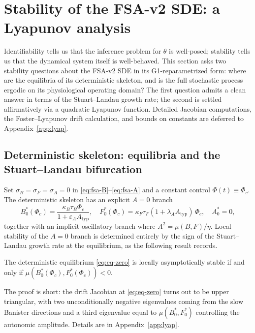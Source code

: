 \section{Stability of the FSA-v2 SDE: a Lyapunov analysis}\label{sec:lyap}

Identifiability tells us that the inference problem for $\theta$ is
well-posed; stability tells us that the dynamical system itself is
well-behaved. This section asks two stability questions about the
FSA-v2 SDE in its G1-reparametrized form: where are the equilibria
of its deterministic skeleton, and is the full stochastic process
ergodic on its physiological operating domain? The first question
admits a clean answer in terms of the Stuart--Landau growth rate;
the second is settled affirmatively via a quadratic Lyapunov
function. Detailed Jacobian computations, the Foster--Lyapunov drift
calculation, and bounds on constants are deferred to
Appendix~\ref{app:lyap}.

\subsection{Deterministic skeleton: equilibria and the Stuart--Landau bifurcation}\label{sec:lyap-det}

Set $\sigma_B = \sigma_F = \sigma_A = 0$ in
\eqref{eq:fsa-B}--\eqref{eq:fsa-A} and a constant control
$\Phi(t) \equiv \Phi_c$. The deterministic skeleton has an explicit
$A=0$ branch
\begin{equation}
  B^*_0(\Phi_c) = \frac{\kappa_B \tau_B \Phi_c}{1+\varepsilon_A A_{\mathrm{typ}}},
  \quad
  F^*_0(\Phi_c) = \kappa_F \tau_F (1+\lambda_A A_{\mathrm{typ}})\,\Phi_c,
  \quad
  A^*_0 = 0,
  \label{eq:eq-zero}
\end{equation}
together with an implicit oscillatory branch where $A^2 = \mu(B,F)/\eta$.
Local stability of the $A=0$ branch is determined entirely by the
sign of the Stuart--Landau growth rate at the equilibrium, as the
following result records.

\begin{proposition}[Local stability of the $A=0$ branch]\label{prop:stab-zero}
The deterministic equilibrium \eqref{eq:eq-zero} is locally
asymptotically stable if and only if
$\mu(B^*_0(\Phi_c), F^*_0(\Phi_c)) < 0$.
\end{proposition}

The proof is short: the drift Jacobian at \eqref{eq:eq-zero} turns
out to be upper triangular, with two unconditionally negative
eigenvalues coming from the slow Banister directions and a third
eigenvalue equal to $\mu(B^*_0,F^*_0)$ controlling the autonomic
amplitude. Details are in Appendix~\ref{app:lyap}.

